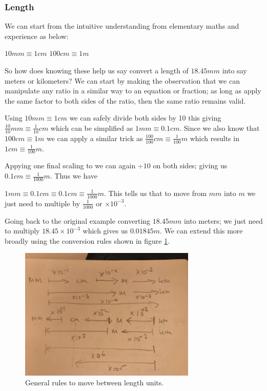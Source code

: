 \subsubsection{Length}

We can start from the intuitive understanding from elementary maths and experience as below: 

$ 10mm \equiv 1 cm $
$ 100cm \equiv 1m $

So how does knowing these help us say convert a length of $18.45 mm$ into say meters or kilometers?  We can start by making the observation that we can manipulate any ratio in a similar way to an equation or fraction; as long as apply the same factor to both sides of the ratio, then the same ratio remains valid.

Using $ 10mm \equiv 1 cm $ we can safely divide both sides by 10 this giving $ \frac{10}{10}mm \equiv \frac{1}{10} cm $ which can be simplified as $ 1mm \equiv 0.1 cm $. Since we also know that $ 100cm \equiv 1m $ we can apply a similar trick as $ \frac{100}{100}cm \equiv \frac{1}{100}m $ which results in $ 1cm \equiv \frac{1}{100}m $.

Appying one final scaling to we can again $ \div 10 $ on both sides; giving us $ 0.1cm \equiv \frac{1}{1000}m $. Thus we have

$ 1mm \equiv 0.1 cm  \equiv 0.1cm \equiv \frac{1}{1000}m $. This tells us that to move from $mm$ into $m$ we just need to multiple by $\frac{1}{1000}$ or $ \times 10^{-3}$. 

Going back to the original example converting  $18.45 mm$ into meters; we just need to multiply  $18.45 \times 10^{-3} $ which gives us $0.01845 m $. We can extend this more broadly using the conversion rules shown in figure \ref{fig:convert0}.

\begin{figure}[h]
    \centering
    \includegraphics[width=0.75\textwidth]{IMG_2968}
    \caption{General rules to move between length units.}
    \label{fig:convert0}
\end{figure}

